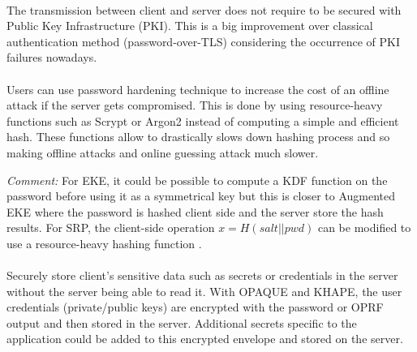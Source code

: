 ﻿\documentclass[../report.tex]{subfiles}
\begin{document}
\paragraph{} %
The transmission between client and server does not require to be secured with Public Key Infrastructure (PKI). This is a big improvement over classical authentication method (password-over-TLS) considering the occurrence of PKI failures nowadays. %


\paragraph{}  \label{sec:password_hardening_comparison}
Users can use password hardening technique to increase the cost of an offline attack if the server gets compromised. This is done by using resource-heavy functions such as Scrypt \cite{Scrypt_Paper} or Argon2 \cite{Argon2_Paper} instead of computing a simple and efficient hash. These functions allow to drastically slows down hashing process and so making offline attacks and online guessing attack much slower.

\emph{Comment:} For EKE, it could be possible to compute a KDF function on the password before using it as a symmetrical key but this is closer to Augmented EKE \cite{AEKE_Paper} where the password is hashed client side and the server store the hash results.
For SRP, the client-side operation $x = H(salt||pwd)$ can be modified to use a resource-heavy hashing function \cite{SRP_1Password_blog}.


\paragraph{}
Securely store client's sensitive data such as secrets or credentials in the server without the server being able to read it. With OPAQUE and KHAPE, the user credentials (private/public keys) are encrypted with the password or OPRF output and then stored in the server. Additional secrets specific to the application could be added to this encrypted envelope and stored on the server.
\end{document}
